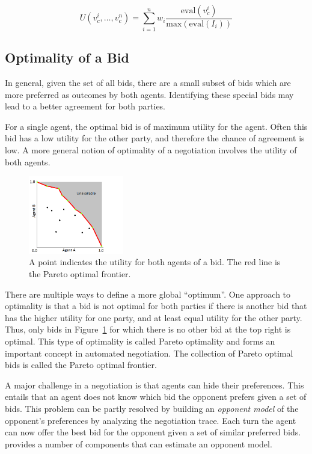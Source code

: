 \documentclass[]{article}
\begin{document}
\begin{equation}
	U(v^i_{c},\ldots,v^n_{c}) = \sum_{i=1}^{n} w_i \dfrac{\text{eval}(v^i_{c})}{\text{max}(\text{eval}(I_i))}
	\label{eqn:Utility}
\end{equation}


\subsection{Optimality of a Bid}
In general, given the set of all bids, there are a small subset of bids which are more preferred as outcomes by both agents. Identifying these special bids may lead to a better agreement for both parties.

For a single agent, the optimal bid is of maximum utility for the agent. Often this bid has a low utility for the other party, and therefore the chance of agreement is low. A more general notion of optimality of a negotiation involves the utility of both agents.

\begin{figure}[htb]
	\centering
	\includegraphics[width=0.37\textwidth]{media/image5.png}
\caption{A point indicates the utility for both agents of a bid. The red line is the Pareto optimal frontier.}\label{Fig:utility plot}
\end{figure}

There are multiple ways to define a more global ``optimum''. One approach to optimality is that a bid is not optimal for both parties if there is another bid that has the higher utility for one party, and at least equal utility for the other party. Thus, only bids in Figure~\ref{Fig:utility plot} for which there is no other bid at the top right is optimal. This type of optimality is called Pareto optimality and forms an important concept in automated negotiation. The collection of Pareto optimal bids is called the Pareto optimal frontier.

A major challenge in a negotiation is that agents can hide their preferences. This entails that an agent does not know which bid the opponent prefers given a set of bids. This problem can be partly resolved by building an \textit{opponent model} of the opponent's preferences by analyzing the negotiation trace. Each turn the agent can now offer the best bid for the opponent given a set of similar preferred bids. \Genius  provides a number of components that can estimate an opponent model.
\end{document}
